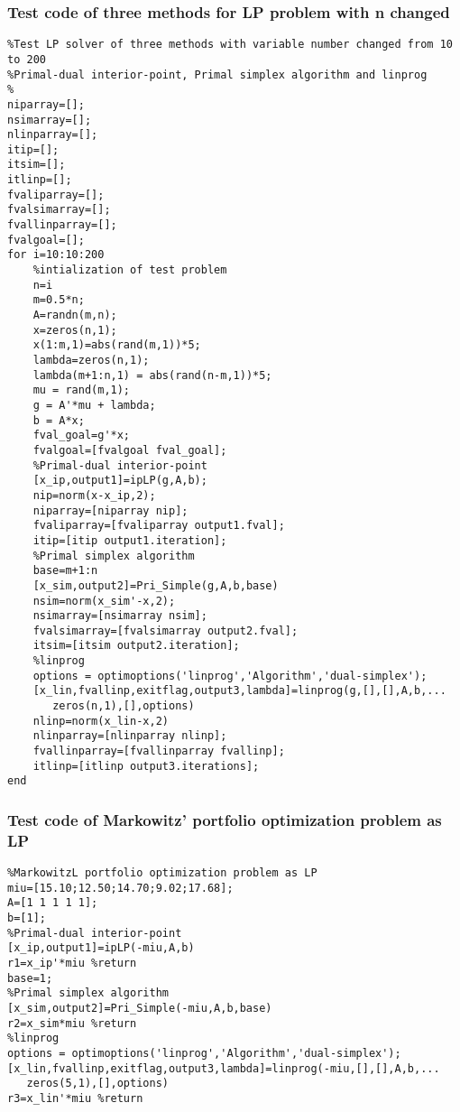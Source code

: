 \subsubsection{\bfseries Test code of three methods for LP problem with n changed}
\label{6.4.1}
{\setmainfont{Courier New Bold} \scriptsize         
\begin{lstlisting}
%Test LP solver of three methods with variable number changed from 10 to 200
%Primal-dual interior-point, Primal simplex algorithm and linprog 
%
niparray=[];
nsimarray=[];
nlinparray=[];
itip=[];
itsim=[];
itlinp=[];
fvaliparray=[];
fvalsimarray=[];
fvallinparray=[];
fvalgoal=[];
for i=10:10:200
    %intialization of test problem
    n=i
    m=0.5*n;
    A=randn(m,n);
    x=zeros(n,1);
    x(1:m,1)=abs(rand(m,1))*5;
    lambda=zeros(n,1);
    lambda(m+1:n,1) = abs(rand(n-m,1))*5;
    mu = rand(m,1);
    g = A'*mu + lambda;
    b = A*x;
    fval_goal=g'*x;
    fvalgoal=[fvalgoal fval_goal];
    %Primal-dual interior-point
    [x_ip,output1]=ipLP(g,A,b);
    nip=norm(x-x_ip,2);
    niparray=[niparray nip];
    fvaliparray=[fvaliparray output1.fval];
    itip=[itip output1.iteration];
    %Primal simplex algorithm
    base=m+1:n
    [x_sim,output2]=Pri_Simple(g,A,b,base)
    nsim=norm(x_sim'-x,2);
    nsimarray=[nsimarray nsim];
    fvalsimarray=[fvalsimarray output2.fval];
    itsim=[itsim output2.iteration];
    %linprog 
    options = optimoptions('linprog','Algorithm','dual-simplex');
    [x_lin,fvallinp,exitflag,output3,lambda]=linprog(g,[],[],A,b,...
       zeros(n,1),[],options)
    nlinp=norm(x_lin-x,2)
    nlinparray=[nlinparray nlinp];
    fvallinparray=[fvallinparray fvallinp];
    itlinp=[itlinp output3.iterations];
end
\end{lstlisting}}

\subsubsection{\bfseries Test code of Markowitz’ portfolio optimization problem as LP}
\label{6.4.2}
{\setmainfont{Courier New Bold} \scriptsize         
\begin{lstlisting}
%MarkowitzL portfolio optimization problem as LP
miu=[15.10;12.50;14.70;9.02;17.68];
A=[1 1 1 1 1];
b=[1];
%Primal-dual interior-point
[x_ip,output1]=ipLP(-miu,A,b)
r1=x_ip'*miu %return
base=1;
%Primal simplex algorithm
[x_sim,output2]=Pri_Simple(-miu,A,b,base)
r2=x_sim*miu %return
%linprog
options = optimoptions('linprog','Algorithm','dual-simplex');
[x_lin,fvallinp,exitflag,output3,lambda]=linprog(-miu,[],[],A,b,...
   zeros(5,1),[],options)
r3=x_lin'*miu %return
\end{lstlisting}}

